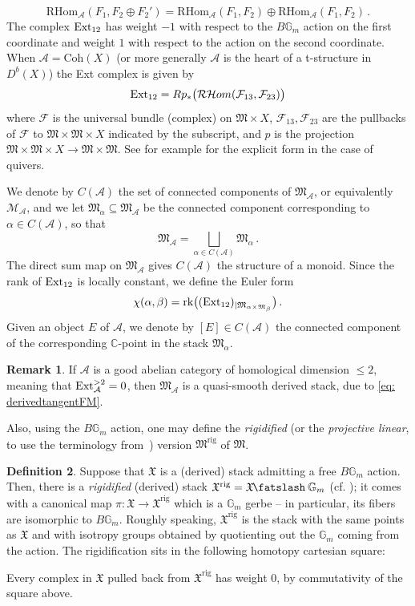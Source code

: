 \documentclass[12pt]{amsart}
\theoremstyle{definition}
\newtheorem{definition}{Definition}[section]
\newtheorem{remark}[definition]{Remark}
\newcommand{\BC}{{\mathbb{C}}}
\newcommand{\BG}{{\mathbb{G}}}
\newcommand{\CA}{{\mathcal A}}
\newcommand{\CF}{{\mathcal F}}
\newcommand{\CM}{{\mathcal M}}
\newcommand{\1}{\mathbf 1}
\newcommand{\myfatslash}{\mathbin{\mkern-6mu\fatslash}}
\newcommand{\FM}{{\mathfrak{M}}}
\newcommand{\FX}{{\mathfrak{X}}}
\newcommand{\Ext}{\mathcal{E}\text{xt}}
\newcommand{\Coh}{\mathrm{Coh}}
\newcommand{\RHom}{\mathrm{RHom}}
\newcommand{\rk}{\mathrm{rk}}
\newcommand{\rig}{\mathrm{rig}}
\renewcommand{\Ext}{\textup{Ext}}
\begin{document}
\[\RHom_\CA(F_1, F_2\oplus F_2')=\RHom_\CA(F_1, F_2)\oplus \RHom_\CA(F_1, F_2)\,.\]
The complex $\Ext_{12}$ has weight $-1$ with respect to the $B\BG_m$ action on the first coordinate and weight $1$ with respect to the action on the second coordinate.
When $\CA=\Coh(X)$ (or more generally $\CA$ is the heart of a t-structure in $D^b(X)$) the Ext complex is given by
\[\Ext_{12}=Rp_\ast\big(\mathcal{RH}om(\CF_{13}, \CF_{23})\big)\]
where $\CF$ is the universal bundle (complex) on $\FM\times X$, $\CF_{13}, \CF_{23}$ are the pullbacks of $\CF$ to $\FM\times \FM\times X$ indicated by the subscript, and $p$ is the projection $\FM\times \FM\times X\to \FM\times \FM$. See for example \cite[(5.4)]{GJT} for the explicit form in the case of quivers.

We denote by $C(\CA)$ the set of connected components of $\FM_\CA$, or equivalently $\CM_\CA$, and we let $\FM_\alpha\subseteq \FM_\CA$ be the connected component corresponding to $\alpha\in C(\CA)$, so that
\[\FM_\CA=\bigsqcup_{\alpha\in C(\CA)}\FM_\alpha\,.\]
The direct sum map on $\FM_\CA$ gives $C(\CA)$ the structure of a monoid. Since the rank of $\Ext_{12}$ is locally constant, we define the Euler form
\[\chi(\alpha, \beta)=\rk\big((\Ext_{12})_{|\FM_{\alpha\times \FM_\beta}}\big)\,.\]
Given an object $E$ of $\CA$, we denote by $[E]\in C(\CA)$ the connected component of the corresponding $\BC$-point in the stack $\FM_\alpha$.


\begin{remark}
    If $\CA$ is a good abelian category of homological dimension $\leq 2$, meaning that $\Ext^{>2}_\CA=0$, then $\FM_{\CA}$ is a quasi-smooth derived stack, due to \eqref{eq: derivedtangentFM}.
\end{remark}


Also, using the $B\mathbb G_m$ action, one may define the \textit{rigidified} (or the \textit{projective linear}, to use the terminology from~\cite{joyce}) version $\FM^{\rig}$ of $\FM$.

\begin{definition}\label{def: rigstack} Suppose that $\FX$ is a (derived) stack admitting a free $B\BG_m$ action. Then, there is a \textit{rigidified} (derived) stack $\FX^\rig=\FX\myfatslash \BG_m$ (cf. \cite[Appendix A]{AOV}); it comes with a canonical map $\pi\colon \FX\to \FX^\rig$ which is a $\BG_m$ gerbe -- in particular, its fibers are isomorphic to $B\BG_m$. Roughly speaking, $\FX^\rig$ is the stack with the same points as $\FX$ and with isotropy groups obtained by quotienting out the $\BG_m$ coming from the action. The rigidification sits in the following homotopy cartesian square:
\begin{center}
\end{center}
Every complex in $\FX$ pulled back from $\FX^\rig$ has weight 0, by commutativity of the square above. 
\end{definition}
\end{document}
